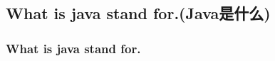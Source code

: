 \documentclass[
  11pt, %
  xcolor=dvipsnames
]{beamer}
\begin{document}
\subsection{What is java stand for.(Java是什么)}
\begin{frame}[fragile]
	\frametitle{What is java stand for.}


	\begin{columns}
		\begin{column}{0.05\textwidth}
		\end{column}
		\begin{column}{0.4\textwidth}
			
		\end{column}
		\begin{column}{0.1\textwidth}
		\end{column}
		\begin{column}{0.4\textwidth}
			\center
			
		\end{column}
		\begin{column}{0.05\textwidth}
		\end{column}
	\end{columns}

\end{frame}
\end{document}
